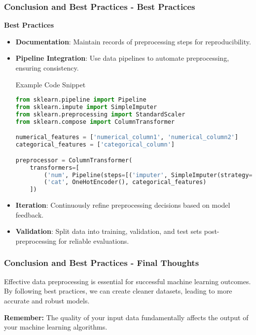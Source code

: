 \documentclass[aspectratio=169]{beamer}
\begin{document}
\begin{frame}[fragile]
  \frametitle{Conclusion and Best Practices - Best Practices}

  \textbf{Best Practices}
  
  \begin{itemize}
    \item \textbf{Documentation}: Maintain records of preprocessing steps for reproducibility.
    \item \textbf{Pipeline Integration}: Use data pipelines to automate preprocessing, ensuring consistency.
      \begin{block}{Example Code Snippet}
      \begin{lstlisting}[language=python]
from sklearn.pipeline import Pipeline
from sklearn.impute import SimpleImputer
from sklearn.preprocessing import StandardScaler
from sklearn.compose import ColumnTransformer

numerical_features = ['numerical_column1', 'numerical_column2']
categorical_features = ['categorical_column']

preprocessor = ColumnTransformer(
    transformers=[
        ('num', Pipeline(steps=[('imputer', SimpleImputer(strategy='mean')), ('scaler', StandardScaler())]), numerical_features),
        ('cat', OneHotEncoder(), categorical_features)
    ])
      \end{lstlisting}
      \end{block}
    \item \textbf{Iteration}: Continuously refine preprocessing decisions based on model feedback.
    \item \textbf{Validation}: Split data into training, validation, and test sets post-preprocessing for reliable evaluations.
  \end{itemize}
\end{frame}

\begin{frame}[fragile]
  \frametitle{Conclusion and Best Practices - Final Thoughts}

  Effective data preprocessing is essential for successful machine learning outcomes. By following best practices, we can create cleaner datasets, leading to more accurate and robust models. 

  \textbf{Remember:} The quality of your input data fundamentally affects the output of your machine learning algorithms.
\end{frame}
\end{document}
